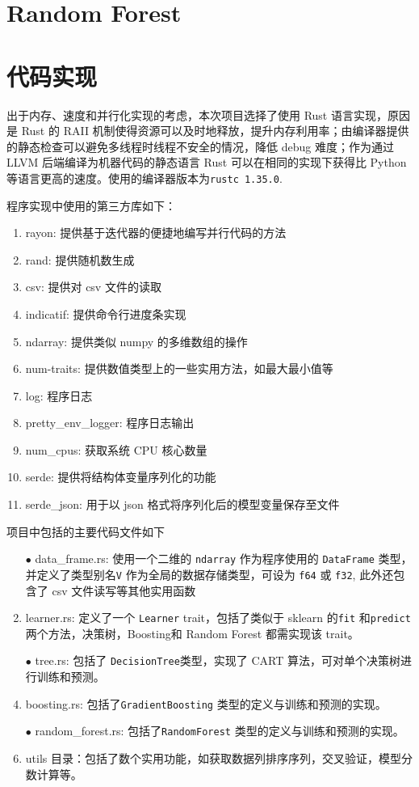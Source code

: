 \documentclass[12pt]{article}
\begin{document}
\section{Random Forest}

\section{代码实现}

出于内存、速度和并行化实现的考虑，本次项目选择了使用 Rust 语言实现，原因是 Rust 的 RAII 机制使得资源可以及时地释放，提升内存利用率；由编译器提供的静态检查可以避免多线程时线程不安全的情况，降低 debug 难度；作为通过 LLVM 后端编译为机器代码的静态语言 Rust 可以在相同的实现下获得比 Python 等语言更高的速度。使用的编译器版本为\lstinline{rustc 1.35.0}.

程序实现中使用的第三方库如下：
\begin{enumerate}
    \item rayon: 提供基于迭代器的便捷地编写并行代码的方法
    \item rand: 提供随机数生成
    \item csv: 提供对 csv 文件的读取
    \item indicatif: 提供命令行进度条实现
    \item ndarray: 提供类似 numpy 的多维数组的操作
    \item num-traits: 提供数值类型上的一些实用方法，如最大最小值等
    \item log: 程序日志
    \item pretty\_env\_logger: 程序日志输出
    \item num\_cpus: 获取系统 CPU 核心数量
    \item serde: 提供将结构体变量序列化的功能
    \item serde\_json: 用于以 json 格式将序列化后的模型变量保存至文件
\end{enumerate}

项目中包括的主要代码文件如下
\begin{enumerate}
    \item[$\bullet$] data\_frame.rs: 使用一个二维的 \lstinline{ndarray} 作为程序使用的 \lstinline{DataFrame} 类型，并定义了类型别名\lstinline{V} 作为全局的数据存储类型，可设为 \lstinline{f64} 或 \lstinline{f32}, 此外还包含了 csv 文件读写等其他实用函数
    \item[$\bullet$] learner.rs: 定义了一个 \lstinline{Learner} trait，包括了类似于 sklearn 的\lstinline{fit} 和\lstinline{predict} 两个方法，决策树，Boosting和 Random Forest 都需实现该 trait。
    \item[$\bullet$] tree.rs: 包括了 \lstinline{DecisionTree}类型，实现了 CART 算法，可对单个决策树进行训练和预测。
    \item[$\bullet$] boosting.rs: 包括了\lstinline{GradientBoosting} 类型的定义与训练和预测的实现。
    \item[$\bullet$] random\_forest.rs: 包括了\lstinline{RandomForest} 类型的定义与训练和预测的实现。
    \item[$\bullet$] utils 目录：包括了数个实用功能，如获取数据列排序序列，交叉验证，模型分数计算等。
\end{enumerate}
\end{document}
